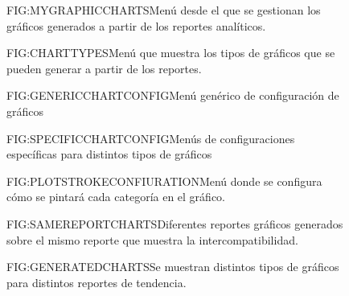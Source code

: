 \begin{figure}[Menú GUI de gestion de las gráficas]{FIG:MYGRAPHICCHARTS}{Menú desde el que se gestionan los gráficos generados a partir de los reportes analíticos.}
\end{figure}

\begin{figure}[Menú de selección de tipo de gráfico]{FIG:CHARTTYPES}{Menú que muestra los tipos de gráficos que se pueden generar a partir de los reportes.}
\end{figure}

\begin{figure}[Configuración de un gráfico (general)]{FIG:GENERICCHARTCONFIG}{Menú genérico de configuración de gráficos}
\end{figure}

\begin{figure}[Configuración de un gráfico (específico)]{FIG:SPECIFICCHARTCONFIG}{Menús de configuraciones específicas para distintos tipos de gráficos}
		 \quad
	 \quad
\end{figure}

\begin{figure}[Configuración de trazos del gráfico por categoría]{FIG:PLOTSTROKECONFIURATION}{Menú donde se configura cómo se pintará cada categoría en el gráfico.}
\end{figure}

\begin{figure}[Mismo reporte, distintos gráficos]{FIG:SAMEREPORTCHARTS}{Diferentes reportes gráficos generados sobre el mismo reporte que muestra la intercompatibilidad.}
 \quad
{} 
\end{figure}

\begin{figure}[Diferentes gráficos generados ]{FIG:GENERATEDCHARTS}{Se muestran distintos tipos de gráficos para distintos reportes de tendencia.}
	 \quad
\end{figure}

